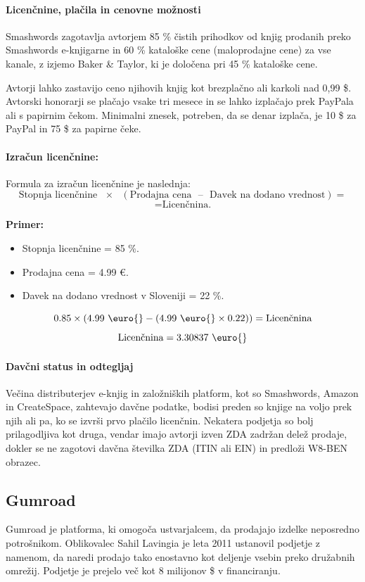 \documentclass[a4paper, 12pt]{book}
\begin{document}
\paragraph{Licenčnine, plačila in cenovne možnosti}
Smashwords zagotavlja avtorjem 85 \% čistih prihodkov od  knjig prodanih preko Smashwords e-knjigarne in 60 \% kataloške cene (maloprodajne cene) za vse kanale, z izjemo Baker \& Taylor, ki je določena pri 45 \% kataloške cene.

Avtorji lahko zastavijo ceno njihovih knjig kot brezplačno ali karkoli nad 0,99 \$. Avtorski honorarji se plačajo vsake tri mesece in se lahko izplačajo prek PayPala ali s papirnim čekom. Minimalni znesek, potreben, da se denar izplača, je 10 \$ za PayPal in 75 \$ za papirne čeke.

\paragraph{Izračun licenčnine:\\}
Formula za izračun licenčnine je naslednja:
$$\textrm{Stopnja licenčnine} \textrm{ } \times \textrm{ } (\textrm{Prodajna cena} \textrm{ } – \textrm{ } \textrm{Davek na dodano vrednost})=$$
$$=\textrm{Licenčnina.}$$

\textbf{Primer:}
\begin{itemize}
	\item Stopnja licenčnine = 85 \%.
	\item Prodajna cena = 4.99 \euro{}.
	\item Davek na dodano vrednost v Sloveniji = 22 \%.
\end{itemize}
$$0.85 \times (4.99 \textrm{ \euro{}} - (4.99 \textrm{ \euro{}} \times 0.22))  = \textrm{Licenčnina}$$
$$\textrm{Licenčnina} = 3.30837 \textrm{ \euro{}}$$

\paragraph{Davčni status in odtegljaj }
Večina distributerjev e-knjig in založniških platform, kot so Smashwords, Amazon in CreateSpace, zahtevajo davčne podatke, bodisi preden so knjige na voljo prek njih ali pa, ko se izvrši prvo plačilo licenčnin. Nekatera podjetja so bolj prilagodljiva kot druga, vendar imajo avtorji izven ZDA zadržan delež prodaje, dokler se ne zagotovi davčna številka ZDA (ITIN ali EIN) in predloži W8-BEN obrazec. 

\subsection{Gumroad}
Gumroad je platforma, ki omogoča ustvarjalcem, da prodajajo izdelke neposredno potrošnikom. Oblikovalec Sahil Lavingia je leta 2011 ustanovil podjetje z namenom, da naredi prodajo tako enostavno kot deljenje vsebin preko družabnih omrežij. \cite{47} Podjetje je prejelo več kot 8 milijonov \$ v financiranju. \cite{48}
\end{document}
